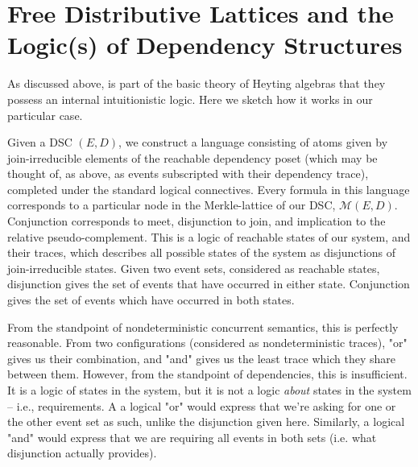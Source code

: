 \documentclass[hoptionsi,review,format=acmsmall]{acmart}
\theoremstyle{definition}
\newcommand{\Mcc}{\mathcal{M}}
\begin{document}

\section{Free Distributive Lattices and the Logic(s) of Dependency Structures}
As discussed above, is part of the basic theory of Heyting algebras that they possess an internal intuitionistic logic. Here we sketch how it works in our particular case.

Given a DSC \((E,D)\), we construct a language consisting of atoms given by join-irreducible elements of the reachable dependency poset (which may be thought of, as above, as events subscripted with their dependency trace), completed under the standard logical connectives. Every formula in this language corresponds to a particular node in the Merkle-lattice of our DSC, \(\Mcc(E,D)\).  Conjunction corresponds to meet, disjunction to join, and implication to the relative pseudo-complement. This is a logic of reachable states of our system, and their traces, which describes all possible states of the system as disjunctions of join-irreducible states. Given two event sets, considered as reachable states, disjunction gives the set of events that have occurred in either state. Conjunction gives the set of events which have occurred in both states.


From the standpoint of nondeterministic concurrent semantics, this is perfectly reasonable. From two configurations (considered as nondeterministic traces), "or" gives us their combination, and "and" gives us the least trace which they share between them. However, from the standpoint of dependencies, this is insufficient. It is a logic of states in the system, but it is not a logic \textit{about} states in the system -- i.e., requirements. A a logical "or"  would express that we're asking for one or the other event set as such, unlike the disjunction given here. Similarly, a logical "and" would express that we are requiring all events in both sets (i.e. what disjunction actually provides).
\end{document}
